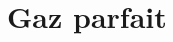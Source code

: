\documentclass[
	a4paper,
	DIV16,
	10pt,
	cleardoublepage=empty,
        twoside=yes,
        BCOR=8.25mm
	]{scrbook}
\begin{document}
 \inidoc

\section{Gaz parfait}

\end{document}
